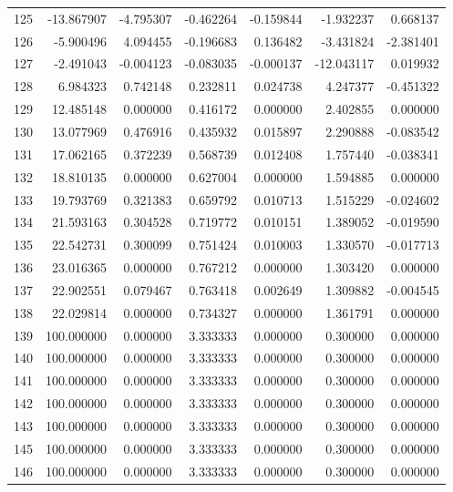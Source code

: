 \begin{tabular}{rrrrrrr}
125 & -13.867907 &   -4.795307 & -0.462264 &   -0.159844 &   -1.932237 &  0.668137 \\
126 &  -5.900496 &    4.094455 & -0.196683 &    0.136482 &   -3.431824 & -2.381401 \\
127 &  -2.491043 &   -0.004123 & -0.083035 &   -0.000137 &  -12.043117 &  0.019932 \\
128 &   6.984323 &    0.742148 &  0.232811 &    0.024738 &    4.247377 & -0.451322 \\
129 &  12.485148 &    0.000000 &  0.416172 &    0.000000 &    2.402855 &  0.000000 \\
130 &  13.077969 &    0.476916 &  0.435932 &    0.015897 &    2.290888 & -0.083542 \\
131 &  17.062165 &    0.372239 &  0.568739 &    0.012408 &    1.757440 & -0.038341 \\
132 &  18.810135 &    0.000000 &  0.627004 &    0.000000 &    1.594885 &  0.000000 \\
133 &  19.793769 &    0.321383 &  0.659792 &    0.010713 &    1.515229 & -0.024602 \\
134 &  21.593163 &    0.304528 &  0.719772 &    0.010151 &    1.389052 & -0.019590 \\
135 &  22.542731 &    0.300099 &  0.751424 &    0.010003 &    1.330570 & -0.017713 \\
136 &  23.016365 &    0.000000 &  0.767212 &    0.000000 &    1.303420 &  0.000000 \\
137 &  22.902551 &    0.079467 &  0.763418 &    0.002649 &    1.309882 & -0.004545 \\
138 &  22.029814 &    0.000000 &  0.734327 &    0.000000 &    1.361791 &  0.000000 \\
139 & 100.000000 &    0.000000 &  3.333333 &    0.000000 &    0.300000 &  0.000000 \\
140 & 100.000000 &    0.000000 &  3.333333 &    0.000000 &    0.300000 &  0.000000 \\
141 & 100.000000 &    0.000000 &  3.333333 &    0.000000 &    0.300000 &  0.000000 \\
142 & 100.000000 &    0.000000 &  3.333333 &    0.000000 &    0.300000 &  0.000000 \\
143 & 100.000000 &    0.000000 &  3.333333 &    0.000000 &    0.300000 &  0.000000 \\
145 & 100.000000 &    0.000000 &  3.333333 &    0.000000 &    0.300000 &  0.000000 \\
146 & 100.000000 &    0.000000 &  3.333333 &    0.000000 &    0.300000 &  0.000000 \\

\end{tabular}
